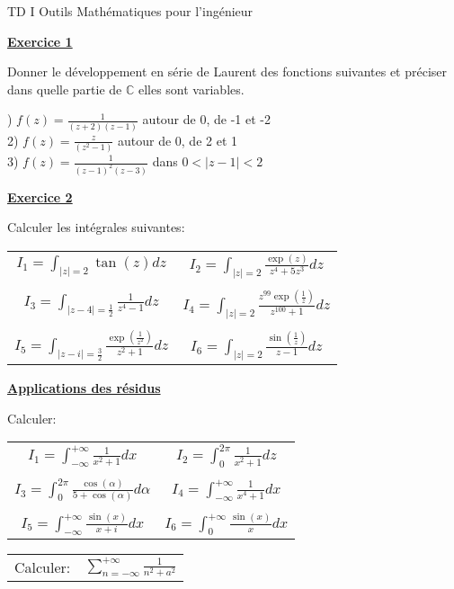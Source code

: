 \documentclass[12pt]{article}
\begin{document}
\begin{center}
{\LARGE TD I Outils Mathématiques pour l'ingénieur}
\end{center}


\begin{center}
\underline{\textbf{Exercice 1}}
\end{center}
Donner le développement en série de Laurent des fonctions suivantes et préciser dans quelle partie 
de $ \mathbb{C} $ elles sont variables.
\\
\par{}) $ f(z) = \frac{1}{(z+2)(z-1)} $ autour de 0, de -1 et -2 \\
2) $ f(z) = \frac{z}{(z^{2}-1)} $ autour de 0, de 2 et 1 \\
3) $ f(z) = \frac{1}{(z-1)^{2}(z-3)} $ dans $ 0 < \mid z-1\mid < 2 $ \\

\par\noindent
\begin{center}
\underline{\textbf{Exercice 2}}
\end{center}
Calculer les intégrales suivantes:
\par\noindent
\begin{center}
\begin{tabular}{c c}
$ I_{1} = \displaystyle{\int_{\mid z\mid = 2}}\tan(z)dz $ &
$ I_{2} = \displaystyle{\int_{\mid z\mid = 2}}\frac{\exp(z)}{z^{4} + 5z^{3}} dz $
\\
 & 
\\
$ I_{3} = \displaystyle{\int_{\mid z-4\mid = \frac{1}{2}}}\frac{1}{z^{4}-1}dz $ &
$ I_{4} = \displaystyle{\int_{\mid z\mid = 2}}\frac{z^{99}\exp(\frac{1}{z})}{z^{100} + 1} dz $
\\
 & 
\\
$ I_{5} = \displaystyle{\int_{\mid z-i\mid = \frac{3}{2}}}\frac{\exp(\frac{1}{z^{2}})}{z^{2}+1} dz $ &
$ I_{6} = \displaystyle{\int_{\mid z\mid = 2}}\frac{\sin(\frac{1}{z})}{z-1}dz $
\end{tabular}
\end{center}

\par\noindent
\begin{center}
\underline{\textbf{Applications des résidus}}
\end{center}
Calculer:
\par\noindent
\begin{center}
\begin{tabular}{c c}
$ I_{1} = \displaystyle{\int_{-\infty}^{+\infty}}\frac{1}{x^{2}+1} dx $ &
$ I_{2} = \displaystyle{\int_{0}^{2\pi}}\frac{1}{x^{2}+1} dz $
\\
 & 
\\
$ I_{3} = \displaystyle{\int_{0}^{2\pi}}\frac{\cos(\alpha)}{5+\cos(\alpha)}d\alpha $ &
$ I_{4} = \displaystyle{\int_{-\infty}^{+\infty}}\frac{1}{x^{4}+1} dx $
\\
 & 
\\
$ I_{5} = \displaystyle{\int_{-\infty}^{+\infty}}\frac{\sin(x)}{x+i} dx $ &
$ I_{6} = \displaystyle{\int_{0}^{+\infty}}\frac{\sin(x)}{x} dx $
\end{tabular}
\end{center}

\par\noindent
\begin{tabular}{c c}
Calculer: &
$ \displaystyle{\sum_{n=-\infty}^{+\infty}}\frac{1}{n^{2}+a^{2}} $
\end{tabular}
\end{document}

